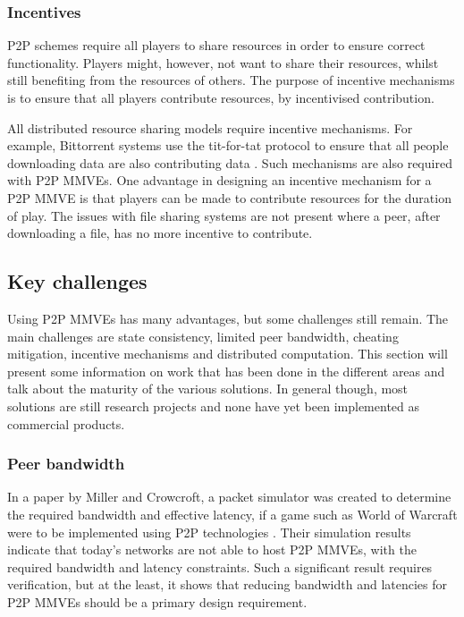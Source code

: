 \subsubsection{Incentives}

P2P schemes require all players to share resources in order to ensure correct functionality. Players might, however, not want to share their resources, whilst still benefiting from the resources of others. The purpose of incentive mechanisms is to ensure that all players contribute resources, by incentivised contribution.

All distributed resource sharing models require incentive mechanisms. For example, Bittorrent systems use the tit-for-tat protocol to ensure that all people downloading data are also contributing data \cite{tit_for_tat}. Such mechanisms are also required with P2P MMVEs. One advantage in designing an incentive mechanism for a P2P MMVE is that players can be made to contribute resources for the duration of play. The issues with file sharing systems are not present where a peer, after downloading a file, has no more incentive to contribute.

\subsection{Key challenges}
\label{key_challenges}

Using P2P MMVEs has many advantages, but some challenges still remain. The main challenges are state consistency, limited peer bandwidth, cheating mitigation, incentive mechanisms and distributed computation. This section will present some information on work that has been done in the different areas and talk about the maturity of the various solutions. In general though, most solutions are still research projects and none have yet been implemented as commercial products.

\subsubsection{Peer bandwidth}
\label{peer_bandwidth_usage}

In a paper by Miller and Crowcroft, a packet simulator was created to determine the required bandwidth and effective latency, if a game such as World of Warcraft were to be implemented using P2P technologies \cite{Miller_p2p_infeasability}. Their simulation results indicate that today's networks are not able to host P2P MMVEs, with the required bandwidth and latency constraints. Such a significant result requires verification, but at the least, it shows that reducing bandwidth and latencies for P2P MMVEs should be a primary design requirement.

